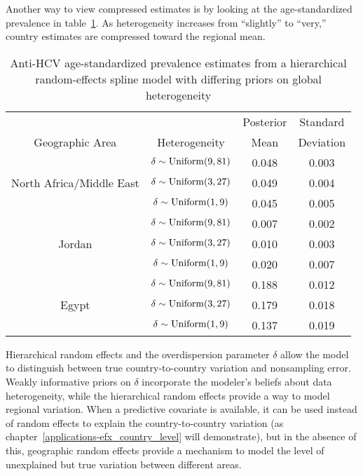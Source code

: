 Another way to view compressed estimates is by looking at the
age-standardized prevalence in table~\ref{tab:app-hepc global rfx}.
As heterogeneity increases from ``slightly'' to ``very,'' country
estimates are compressed toward the regional mean.

    \begin{table}[h]
        \begin{center}
        \begin{tabular}{|c|c|c|c|}
            \hline
                & & Posterior & Standard \\
                Geographic Area & Heterogeneity & Mean & Deviation \\
            \hline
                & $\delta \sim \operatorname{Uniform}(9,81)$ & 0.048 & 0.003 \\
                North Africa/Middle East & $\delta \sim \operatorname{Uniform}(3,27)$ & 0.049 & 0.004 \\
                & $\delta \sim \operatorname{Uniform}(1,9)$ & 0.045 & 0.005 \\
            \hline
                & $\delta \sim \operatorname{Uniform}(9,81)$ & 0.007 & 0.002 \\
                Jordan & $\delta \sim \operatorname{Uniform}(3,27)$ & 0.010 & 0.003 \\
                & $\delta \sim \operatorname{Uniform}(1,9)$ & 0.020 & 0.007 \\
            \hline
                & $\delta \sim \operatorname{Uniform}(9,81)$ & 0.188 & 0.012 \\
                Egypt & $\delta \sim \operatorname{Uniform}(3,27)$ & 0.179 & 0.018 \\
                & $\delta \sim \operatorname{Uniform}(1,9)$ & 0.137 & 0.019 \\
            \hline
        \end{tabular}
        \end{center}
        \caption{Anti-HCV age-standardized prevalence estimates
          from a hierarchical random-effects spline model with differing
          priors on global heterogeneity}
        \label{tab:app-hepc global rfx}
    \end{table}

Hierarchical random effects and the overdispersion parameter
$\delta$ allow the model to distinguish between true
country-to-country variation and nonsampling error.  Weakly
informative priors on $\delta$ incorporate the modeler's beliefs about
data heterogeneity, while the hierarchical random effects provide a way
to model regional variation.  When a predictive covariate is
available, it can be used instead of random effects to explain the
country-to-country variation (as
chapter~\ref{applications-efx_country_level} will demonstrate), but in
the absence of this, geographic random effects provide a mechanism to
model the level of unexplained but true variation between different
areas.

